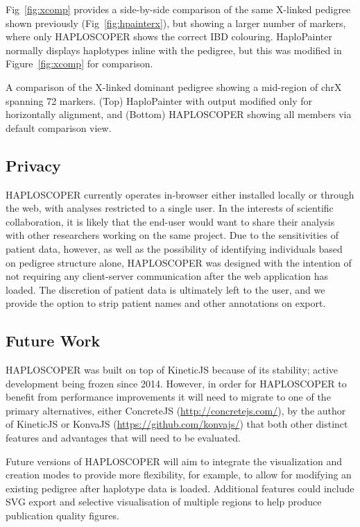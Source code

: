 \documentclass{assets/biotemplate/bioinfo}
\numberwithin{equation}{section}
\def\haplo{{HAPLOSCOPER}}            %
\def\hpainter{{HaploPainter}}
\begin{document}
Fig~\ref{fig:xcomp} provides a side-by-side comparison of the same X-linked pedigree shown previously (Fig~\ref{fig:hpainterx}), but showing a larger number of markers, where only \haplo{} shows the correct IBD colouring. \hpainter{} normally displays haplotypes inline with the pedigree, but this was modified in Figure~\ref{fig:xcomp} for comparison.

	{A comparison of the X-linked dominant pedigree showing a mid-region of chrX spanning 72 markers.
(Top) \hpainter{} with output modified only for horizontally alignment, and (Bottom) \haplo{} showing all members via default comparison view.}



\subsection{Privacy}

\haplo{} currently operates in-browser either installed locally or through the web, with analyses restricted to a single user. In the interests of scientific collaboration, it is likely that the end-user would want to share their analysis with other researchers working on the same project. Due to the sensitivities of patient data, however, as well as the possibility of identifying individuals based on pedigree structure alone, \haplo{} was designed with the intention of not requiring any client-server communication after the web application has loaded. The discretion of patient data is ultimately left to the user, and we provide the option to strip patient names and other annotations on export.

\subsection{Future Work}

\haplo{} was built on top of KineticJS because of its stability; active development being frozen since 2014. However, in order for \haplo{} to benefit from performance improvements it will need to migrate to one of the primary alternatives, either {ConcreteJS (\url{http://concretejs.com/})}, by the author of KineticJS or {KonvaJS (\url{https://github.com/konvajs/})} that both other distinct features and advantages that will need to be evaluated.


Future versions of \haplo{} will aim to integrate the visualization and creation modes to provide more flexibility, for example, to allow for modifying an existing pedigree after haplotype data is loaded.
Additional features could include SVG export and selective visualisation of multiple regions to help produce publication quality figures.



\end{document}
